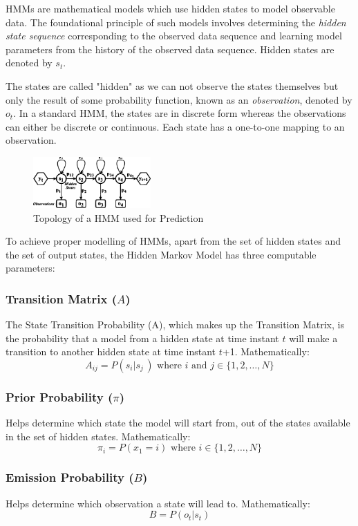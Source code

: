 \documentclass[conference]{IEEEtran}
\begin{document}
HMMs are mathematical models which use hidden states to model observable data. The foundational principle of such models involves determining the \textit{hidden state sequence} corresponding to the observed data sequence and learning model parameters from the history of the observed data sequence. Hidden states are denoted by $s_t$.

The states are called "hidden" as we can not observe the states themselves but only the result of some probability function, known as an \textit{observation}, denoted by $o_t$. In a standard HMM, the states are in discrete form whereas the observations can either be discrete or continuous. Each state has a one-to-one mapping to an observation.

\begin{figure}[htbp]
  \centering
  \includegraphics[width=0.4\textwidth]{HMM.eps}
  \caption{Topology of a HMM used for Prediction}
  \label{fig:hmm_exp}
\end{figure}

To achieve proper modelling of HMMs, apart from the set of hidden states and the set of output states, the Hidden Markov Model has three computable parameters:

\subsubsection{Transition Matrix ($A$)}

The State Transition Probability (A), which makes up the Transition Matrix, is the probability that a model from a hidden state  at time instant $t$ will make a transition to another hidden state at time instant $t$+1. Mathematically: 
\[ A_{ij} =  P(s_i | s_j \,)  \text{ where } i \text{ and } j \in \{1, 2, \ldots, N\}\]

\subsubsection{Prior Probability ($\pi$)}
Helps determine which state the model will start from, out of the states available in the set of hidden states. Mathematically:
\[
\pi_i = P(x_1 = i) \text{ where } i \in \{1, 2, \ldots, N\}
\]

\subsubsection{Emission Probability ($B$)}
Helps determine which observation a state will lead to. Mathematically:
\[ B = P(o_t | s_t)\]
\end{document}
